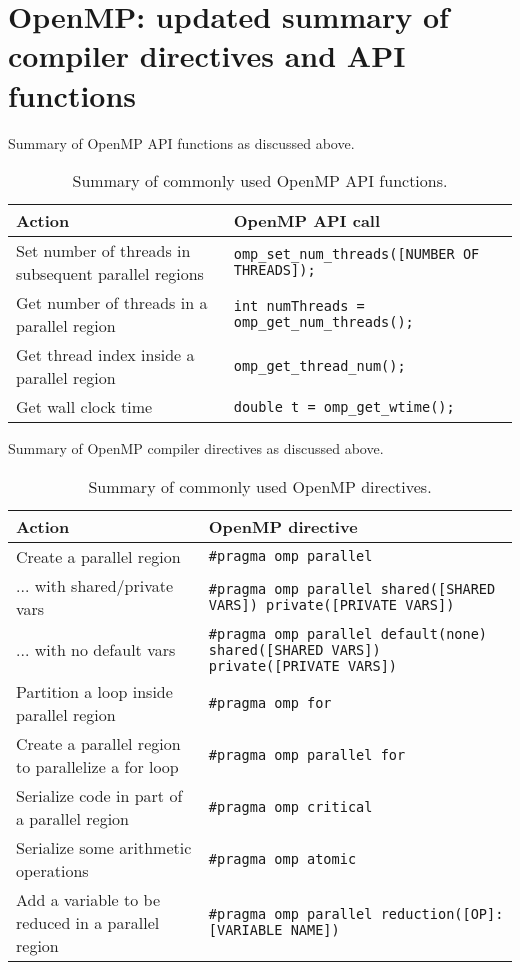 \section{OpenMP: updated summary of compiler directives and API functions}

Summary of OpenMP  API functions as discussed above.
\begin{table}[htbp!]
    \centering
    \begin{tabular}{p{2in}|l} \hline
      Action & OpenMP API call\\ \hline
      Set number of threads in subsequent parallel regions & \texttt{omp\_set\_num\_threads([NUMBER OF THREADS]);} \\
      Get number of threads in a parallel region & \texttt{int numThreads = omp\_get\_num\_threads();} \\
      Get thread index inside a parallel region & \texttt{omp\_get\_thread\_num();} \\ \hline
      Get wall clock time & \texttt{double t = omp\_get\_wtime();} \\
    \hline\end{tabular}
    \caption{Summary of commonly used OpenMP API functions.}
    \label{ompDirectives.tab}
\end{table}

Summary of OpenMP compiler directives as discussed above.
\begin{table}[htbp!]
    \centering
    \begin{tabular}{p{1.5in}|p{4in}} \hline
      Action & OpenMP directive\\ \hline
      Create a parallel region & \texttt{\#pragma omp parallel} \\
      ... with shared/private vars & \texttt{\#pragma omp parallel shared([SHARED VARS]) private([PRIVATE VARS])} \\
            ... with no default vars & \texttt{\#pragma omp parallel default(none) shared([SHARED VARS]) private([PRIVATE VARS])} \\
       Partition a loop inside parallel region & \texttt{\#pragma omp for} \\
       Create a parallel region to parallelize a for loop & \texttt{\#pragma omp parallel for} \\ \hline \hline
       Serialize code in part of a parallel region & \texttt{\#pragma omp critical} \\
       Serialize some arithmetic operations & \texttt{\#pragma omp atomic} \\
       Add a variable to be reduced in a parallel region & \texttt{\#pragma omp parallel reduction([OP]:[VARIABLE NAME])} \\
    \hline\end{tabular}
    \caption{Summary of commonly used OpenMP directives.}
    \label{ompDirectives.tab}
\end{table}

